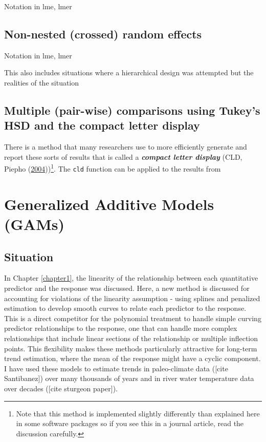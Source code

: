\documentclass[
]{book}
\begin{document}
Notation in lme, lmer

\hypertarget{section8-3}{%
\section{Non-nested (crossed) random effects}\label{section8-3}}

Notation in lme, lmer

This also includes situations where a hierarchical design was attempted but the realities of the situation

\hypertarget{section8-4}{%
\section{Multiple (pair-wise) comparisons using Tukey's HSD and the compact letter display}\label{section8-4}}

\indent There is a method that many researchers use to more efficiently generate and
report these sorts of results that is called a \textbf{\emph{compact letter display}} 
(CLD, Piepho (\protect\hyperlink{ref-Piepho2004}{2004}))\footnote{Note that this method is implemented slightly differently than explained here in some software packages so if you see this in a journal article, read the discussion carefully.}. The \texttt{cld} function can be applied to the results from

\hypertarget{chapter9}{%
\chapter{Generalized Additive Models (GAMs)}\label{chapter9}}

\hypertarget{section9-1}{%
\section{Situation}\label{section9-1}}

In Chapter \ref{chapter1}, the linearity of the relationship between each quantitative predictor and the response was discussed. Here, a new method is discussed for accounting for violations of the linearity assumption - using splines and penalized estimation to develop smooth curves to relate each predictor to the response. This is a direct competitor for the polynomial treatment to handle simple curving predictor relationships to the response, one that can handle more complex relationships that include linear sections of the relationship or multiple inflection points. This flexibility makes these methods particularly attractive for long-term trend estimation, where the mean of the response might have a cyclic component. I have used these models to estimate trends in paleo-climate data ({[}cite Santibanez{]}) over many thousands of years and in river water temperature data over decades ({[}cite sturgeon paper{]}).
\end{document}
